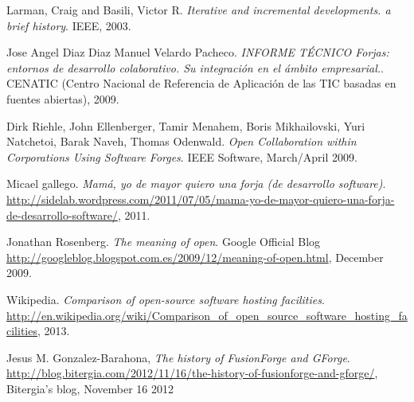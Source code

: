 \documentclass[a4paper, 12pt]{book}
\begin{document}

\begin{comment}
    Referenciar bibliografía: reference 1 ~\cite{New-commercial-OSS-standford-2010}.
\end{comment}

\begin{thebibliography}{25}


 Larman, Craig and Basili, Victor R. \textit{Iterative and incremental developments. a brief history}. IEEE, 2003.


 Jose Angel Diaz Diaz Manuel Velardo Pacheco. \textit{INFORME TÉCNICO Forjas: entornos de desarrollo colaborativo. Su integración en el ámbito empresarial.}. CENATIC (Centro Nacional de Referencia de Aplicación de las TIC basadas en fuentes abiertas), 2009.

 Dirk Riehle, John Ellenberger, Tamir Menahem, Boris Mikhailovski, Yuri Natchetoi, Barak Naveh, Thomas Odenwald. \textit{Open Collaboration within Corporations Using Software Forges}. IEEE Software, March/April 2009.

 Micael gallego. \textit{Mamá, yo de mayor quiero una forja (de desarrollo software)}. \url{http://sidelab.wordpress.com/2011/07/05/mama-yo-de-mayor-quiero-una-forja-de-desarrollo-software/}, 2011.

 Jonathan Rosenberg. \textit{The meaning of open}. Google Official Blog \url{http://googleblog.blogspot.com.es/2009/12/meaning-of-open.html}, December 2009.

 Wikipedia. \textit{Comparison of open-source software hosting facilities}. \url{http://en.wikipedia.org/wiki/Comparison_of_open_source_software_hosting_facilities}, 2013.

 Jesus M. Gonzalez-Barahona, \textit{The history of FusionForge and GForge}. \url{http://blog.bitergia.com/2012/11/16/the-history-of-fusionforge-and-gforge/}, Bitergia's blog, November 16 2012

\end{thebibliography}
\end{document}
